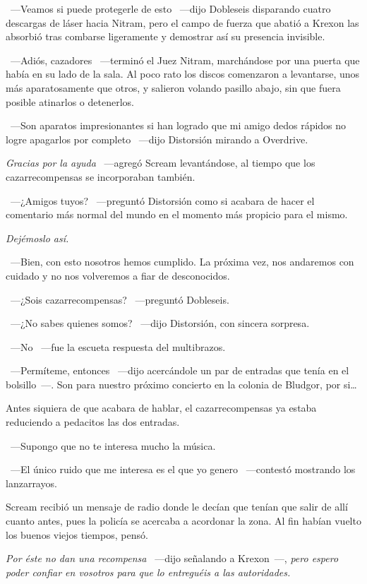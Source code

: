 ~---Veamos si puede protegerle de esto ~---dijo Dobleseis disparando cuatro descargas de láser hacia Nitram, pero el campo de fuerza que abatió a Krexon las absorbió tras combarse ligeramente y demostrar así su presencia invisible.

~---Adiós, cazadores ~---terminó el Juez Nitram, marchándose por una puerta que había en su lado de la sala. Al poco rato los discos comenzaron a levantarse, unos más aparatosamente que otros, y salieron volando pasillo abajo, sin que fuera posible atinarlos o detenerlos.

~---Son aparatos impresionantes si han logrado que mi amigo dedos rápidos no logre apagarlos por completo ~---dijo Distorsión mirando a Overdrive.

\emph{Gracias por la ayuda} ~---agregó Scream levantándose, al tiempo que los cazarrecompensas se incorporaban también.

~---¿Amigos tuyos? ~---preguntó Distorsión como si acabara de hacer el comentario más normal del mundo en el momento más propicio para el mismo.

\emph{Dejémoslo así.}

~---Bien, con esto nosotros hemos cumplido. La próxima vez, nos andaremos con cuidado y no nos volveremos a fiar de desconocidos.

~---¿Sois cazarrecompensas? ~---preguntó Dobleseis.

~---¿No sabes quienes somos? ~---dijo Distorsión, con sincera sorpresa.

~---No ~---fue la escueta respuesta del multibrazos.

~---Permíteme, entonces ~---dijo acercándole un par de entradas que tenía en el bolsillo~---. Son para nuestro próximo concierto en la colonia de Bludgor, por si\dots

Antes siquiera de que acabara de hablar, el cazarrecompensas ya estaba reduciendo a pedacitos las dos entradas.

~---Supongo que no te interesa mucho la música.

~---El único ruido que me interesa es el que yo genero ~---contestó mostrando los lanzarrayos.

Scream recibió un mensaje de radio donde le decían que tenían que salir de allí cuanto antes, pues la policía se acercaba a acordonar la zona. Al fin habían vuelto los buenos viejos tiempos, pensó.

\emph{Por éste no dan una recompensa} ~---dijo señalando a Krexon~---, \emph{pero espero poder confiar en vosotros para que lo entreguéis a las autoridades.}

